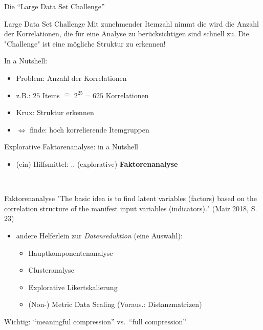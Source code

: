 \documentclass[
  ignorenonframetext,
]{beamer}
\providecommand{\tightlist}{%
  \setlength{\itemsep}{0pt}\setlength{\parskip}{0pt}}
\begin{document}
\begin{frame}{Die ``Large Data Set Challenge''}
\protect\hypertarget{die-large-data-set-challenge-1}{}
\begin{alertblock}{Large Data Set Challenge}
Mit zunehmender Itemzahl nimmt die wird die Anzahl der Korrelationen, die für
eine Analyse zu berücksichtigen sind schnell zu. Die "Challenge" ist eine
mögliche Struktur zu erkennen!
\end{alertblock}

In a Nutshell:

\begin{itemize}
\tightlist
\item
  Problem: Anzahl der Korrelationen
\item
  z.B.: \(25\) Items \(\widehat{=}\) \(2^{25} = 625\) Korrelationen
\item
  Krux: Struktur erkennen
\item
  \(\Leftrightarrow\) finde: hoch korrelierende Itemgruppen
\end{itemize}
\end{frame}

\begin{frame}{Explorative Faktorenanalyse: in a Nutshell}
\protect\hypertarget{explorative-faktorenanalyse-in-a-nutshell}{}
\begin{itemize}
\tightlist
\item
  (ein) Hilfsmittel: .. (explorative) \textbf{Faktorenanalyse}
\end{itemize}

~

\begin{block}{Faktorenanalyse}
"The basic idea is to find latent variables (factors) based on the correlation
structure of the manifest input variables (indicators)." (Mair 2018, S. 23)
\end{block}

\begin{itemize}
\item
  andere Helferlein zur \emph{Datenreduktion} (eine Auswahl):

  \begin{itemize}
  \tightlist
  \item
    Hauptkomponentenanalyse
  \item
    Clusteranalyse
  \item
    Explorative Likertskalierung
  \item
    (Non-) Metric Data Scaling (Voraus.: Distanzmatrizen)
  \end{itemize}
\end{itemize}

Wichtig: ``meaningful compression'' vs.~``full compression''
\end{frame}
\end{document}

